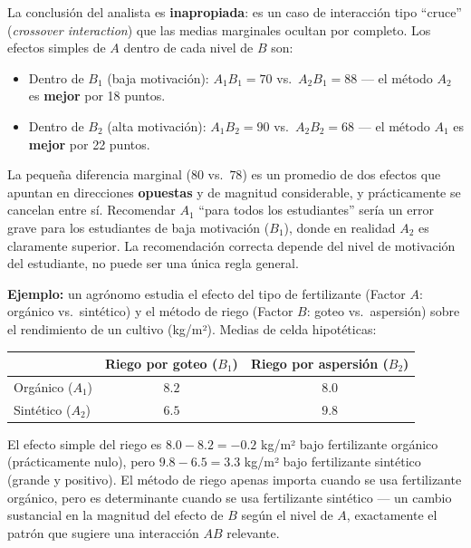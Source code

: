 \begin{solproblema}
	La conclusión del analista es \textbf{inapropiada}: es un caso de interacción tipo ``cruce'' (\emph{crossover interaction}) que las medias marginales ocultan por completo. Los efectos simples de $A$ dentro de cada nivel de $B$ son:
	\begin{itemize}
		\item Dentro de $B_1$ (baja motivación): $A_1B_1 = 70$ vs.\ $A_2B_1 = 88$ — el método $A_2$ es \textbf{mejor} por 18 puntos.
		\item Dentro de $B_2$ (alta motivación): $A_1B_2 = 90$ vs.\ $A_2B_2 = 68$ — el método $A_1$ es \textbf{mejor} por 22 puntos.
	\end{itemize}
	La pequeña diferencia marginal ($80$ vs.\ $78$) es un promedio de dos efectos que apuntan en direcciones \textbf{opuestas} y de magnitud considerable, y prácticamente se cancelan entre sí. Recomendar $A_1$ ``para todos los estudiantes'' sería un error grave para los estudiantes de baja motivación ($B_1$), donde en realidad $A_2$ es claramente superior. La recomendación correcta depende del nivel de motivación del estudiante, no puede ser una única regla general.
\end{solproblema}

\begin{solproblema}[prob:fc779e7]
	\textbf{Ejemplo:} un agrónomo estudia el efecto del tipo de fertilizante (Factor $A$: orgánico vs.\ sintético) y el método de riego (Factor $B$: goteo vs.\ aspersión) sobre el rendimiento de un cultivo (kg/m²). Medias de celda hipotéticas:
	\begin{center}
		\begin{tabular}{lcc}
			\hline
			 & Riego por goteo ($B_1$) & Riego por aspersión ($B_2$) \\ \hline
			Orgánico ($A_1$) & $8.2$ & $8.0$ \\
			Sintético ($A_2$) & $6.5$ & $9.8$ \\ \hline
		\end{tabular}
	\end{center}
	El efecto simple del riego es $8.0 - 8.2 = -0.2$ kg/m² bajo fertilizante orgánico (prácticamente nulo), pero $9.8 - 6.5 = 3.3$ kg/m² bajo fertilizante sintético (grande y positivo). El método de riego apenas importa cuando se usa fertilizante orgánico, pero es determinante cuando se usa fertilizante sintético — un cambio sustancial en la magnitud del efecto de $B$ según el nivel de $A$, exactamente el patrón que sugiere una interacción $AB$ relevante.
\end{solproblema}
